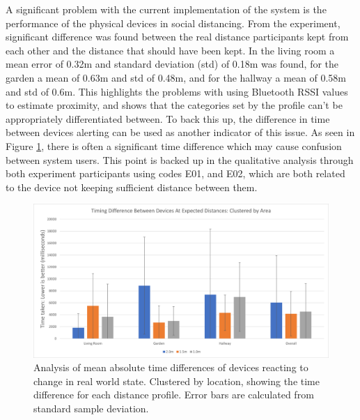 \documentclass{l4proj}
\begin{document}
A significant problem with the current implementation of the system is the performance of the physical devices in social distancing. From the experiment, significant difference was found between the real distance participants kept from each other and the distance that should have been kept. In the living room a mean error of 0.32m and standard deviation (std) of 0.18m was found, for the garden a mean of 0.63m and std of 0.48m, and for the hallway a mean of 0.58m and std of 0.6m. This highlights the problems with using Bluetooth RSSI values to estimate proximity, and shows that the categories set by the profile can't be appropriately differentiated between. To back this up, the difference in time between devices alerting can be used as another indicator of this issue. As seen in Figure \ref{fig:clustered-time-diff}, there is often a significant time difference which may cause confusion between system users. This point is backed up in the qualitative analysis through both experiment participants using codes E01, and E02, which are both related to the device not keeping sufficient distance between them.

\begin{figure}[!htb]
    \centering
    \includegraphics[width=1.0\linewidth]{images/clustered-time-diff.png}

    \caption{ Analysis of mean absolute time differences of devices reacting to change in real world state. Clustered by location, showing the time difference for each distance profile. Error bars are calculated from standard sample deviation. }

    \label{fig:clustered-time-diff}
\end{figure}
\end{document}
